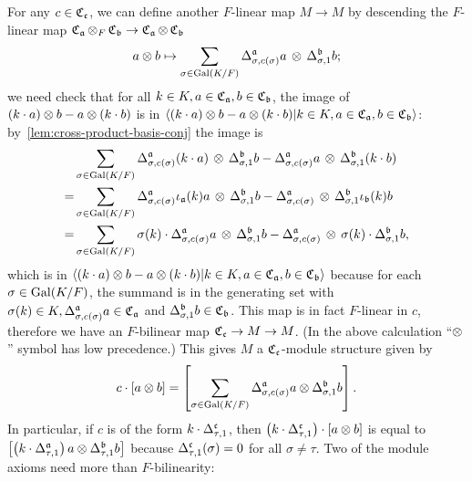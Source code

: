 \begin{construction}[$M$]
  For any $c \in \operatorname{\mathfrak{C}}_{\mathfrak{c}}$, we can define another $F$-linear map $M \to M$ by descending the $F$-linear map $\operatorname{\mathfrak{C}}_{\mathfrak{a}}\otimes_{F}\operatorname{\mathfrak{C}}_{\mathfrak{b}} \to \operatorname{\mathfrak{C}}_{\mathfrak{a}}\otimes \operatorname{\mathfrak{C}}_{\mathfrak{b}}$
  \[
      a \otimes b \mapsto \sum_{\sigma\in\operatorname{Gal}(K/F)} \Delta^{\mathfrak{a}}_{\sigma,c(\sigma)}a \, \otimes \, \Delta^{\mathfrak{b}}_{\sigma, 1}b;
    \]
    we need check that for all $k \in K, a \in\operatorname{\mathfrak{C}}_{\mathfrak{a}}, b \in \operatorname{\mathfrak{C}}_{\mathfrak{b}}$, the image of $(k\cdot a)\otimes b - a \otimes (k\cdot b)$ is in
    $\left\langle (k\cdot a)\otimes b - a \otimes (k\cdot b) | k \in K, a \in \operatorname{\mathfrak{C}}_{\mathfrak{a}}, b \in \operatorname{\mathfrak{C}}_{\mathfrak{b}} \right\rangle$: by~\cref{lem:cross-product-basis-conj} the image is
    \[
\begin{aligned}
      & \sum_{\sigma\in\operatorname{Gal}(K/F)}
      \Delta^{\mathfrak{a}}_{\sigma, c(\sigma)}(k \cdot a) \,\otimes\, \Delta^{\mathfrak{b}}_{\sigma, 1}b
      -
        \Delta^{\mathfrak{a}}_{\sigma, c(\sigma)}a \,\otimes\, \Delta^{\mathfrak{b}}_{\sigma, 1}(k \cdot b) \\
  = & \sum_{\sigma\in\operatorname{Gal}(K/F)}
      \Delta^{\mathfrak{a}}_{\sigma,c(\sigma)}\iota_{\mathfrak{a}}(k)a \,\otimes\, \Delta^{\mathfrak{b}}_{\sigma,1}b
      -
      \Delta^{\mathfrak{a}}_{\sigma,c(\sigma)} \,\otimes\, \Delta^{\mathfrak{b}}_{\sigma, 1}\iota_{\mathfrak{b}}(k)b \\
  =& \sum_{\sigma\in\operatorname{Gal}(K/F)}
     \sigma(k)\cdot\Delta^{\mathfrak{a}}_{\sigma, c(\sigma)}a \,\otimes\, \Delta^{\mathfrak{b}}_{\sigma, 1}b
     - \Delta^{\mathfrak{a}}_{\sigma, c(\sigma)} \,\otimes\, \sigma(k)\cdot\Delta^{\mathfrak{b}}_{\sigma,1}b,
  \end{aligned}
\]
which is in $\left\langle (k\cdot a)\otimes b - a \otimes (k\cdot b) | k \in K, a \in \operatorname{\mathfrak{C}}_{\mathfrak{a}}, b \in \operatorname{\mathfrak{C}}_{\mathfrak{b}} \right\rangle$ because for each $\sigma \in \operatorname{Gal}(K/F)$, the summand is in the generating set with $\sigma(k) \in K, \Delta^{\mathfrak{a}}_{\sigma, c(\sigma)}a \in \operatorname{\mathfrak{C}}_{\mathfrak{a}}$ and $\Delta^{\mathfrak{b}}_{\sigma, 1}b \in \operatorname{\mathfrak{C}}_{\mathfrak{b}}$. This map is in fact $F$-linear in $c$, therefore we have an $F$-bilinear map $\operatorname{\mathfrak{C}}_{\mathfrak{c}}\to M \to M$. (In the above calculation ``$\otimes$'' symbol has low precedence.) This gives $M$ a $\operatorname{\mathfrak{C}}_{\mathfrak{c}}$-module structure given by
\[
  c \cdot [a \otimes b] = \left[\sum_{\sigma\in\operatorname{Gal}(K/F)}\Delta^{\mathfrak{a}}_{\sigma, c(\sigma)}a \otimes \Delta^{\mathfrak{b}}_{\sigma, 1}b\right].
\]
In particular, if $c$ is of the form $k \cdot \Delta^{\mathfrak{c}}_{\tau, 1}$, then $\left(k\cdot \Delta^{\mathfrak{c}}_{\tau, 1}\right)\cdot [a \otimes b]$ is equal to $\left[\left(k\cdot \Delta^{\mathfrak{a}}_{\tau,1}\right)a \otimes \Delta^{\mathfrak{b}}_{\tau, 1} b\right]$ because $\Delta_{\tau, 1}^{\mathfrak{c}}(\sigma) = 0$ for all $\sigma \ne \tau$. Two of the module axioms need more than $F$-bilinearity:
\begin{itemize}

\end{itemize}
\end{construction}
